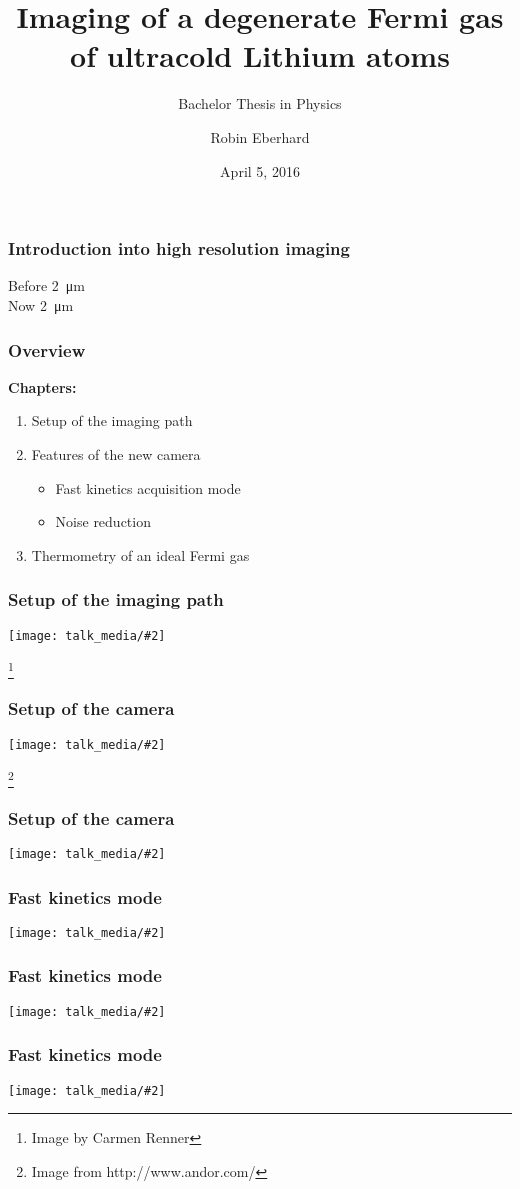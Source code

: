 \documentclass[aspectratio=1610]{beamer}
\title{Imaging of a degenerate Fermi gas of ultracold Lithium atoms}
\subtitle{Bachelor Thesis in Physics}
\author{Robin Eberhard}
\institute{Physics Institute, University of Heidelberg}
\date{April 5, 2016}
\newcommand{\pltsingle}[2][0.8]{
	\begin{center}
		\texttt{[image: talk\_media/\#2]}
	\end{center}
}
\newcommand\blfootnote[1]{%
	\begingroup
	\renewcommand\thefootnote{}\footnote{#1}%
	\addtocounter{footnote}{-1}%
	\endgroup
}
\begin{document}
\maketitle

\begin{frame}[c]
	\frametitle{Introduction into high resolution imaging}
	\centering
	\LARGE
	Before \SI{2}{\micro\meter}\\
	\pause
	\Huge
	Now \SI{2}{\micro\meter}
\end{frame}

\begin{frame}
	\frametitle{Overview}
	\textbf{Chapters:}
	\begin{enumerate}
		\item Setup of the imaging path
		\pause
		\item Features of the new camera
		\begin{itemize}
			\item Fast kinetics acquisition mode
			\item Noise reduction
		\end{itemize}
		\pause
		\item Thermometry of an ideal Fermi gas
	\end{enumerate}
\end{frame}

\begin{frame}
	\frametitle{Setup of the imaging path}
	\pltsingle{renner_setup.jpg}
	\blfootnote{Image by Carmen Renner}
\end{frame}

\begin{frame}
	\frametitle{Setup of the camera}
	\pltsingle[0.5]{camera.jpg}
	\blfootnote{Image from http://www.andor.com/}
\end{frame}

\begin{frame}
	\frametitle{Setup of the camera}
	\pltsingle[0.5]{ccd_shifts.pdf}
\end{frame}

\begin{frame}
	\frametitle{Fast kinetics mode}
	\pltsingle[0.7]{fast__kin_1.pdf}
\end{frame}

\begin{frame}
	\frametitle{Fast kinetics mode}
	\pltsingle[0.7]{fast__kin_2.pdf}
\end{frame}

\begin{frame}
	\frametitle{Fast kinetics mode}
	\pltsingle[0.7]{fast__kin_3.pdf}
\end{frame}
\end{document}
